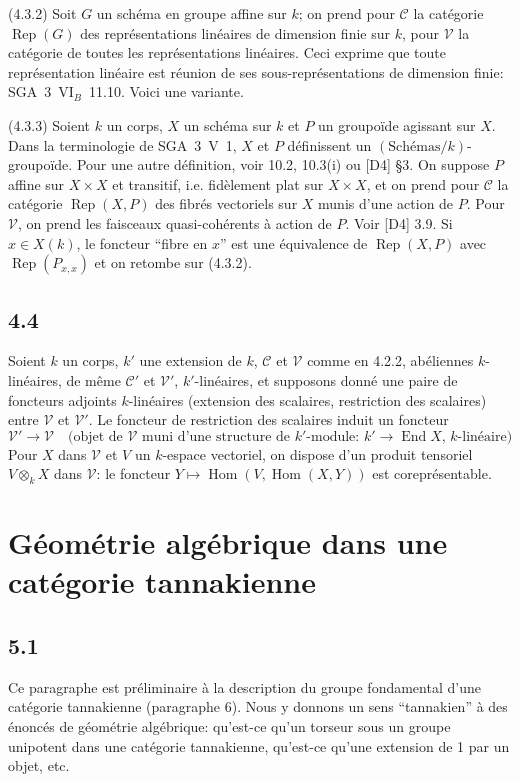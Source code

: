 \documentclass[12pt,a4paper]{article}
\theoremstyle{plain}
\theoremstyle{definition}
\theoremstyle{remark}
\DeclareMathOperator{\Hom}{Hom}
\DeclareMathOperator{\End}{End}
\DeclareMathOperator{\Rep}{Rep}
\begin{document}
(4.3.2) Soit $G$ un schéma en groupe affine sur $k$; on prend pour $\mathcal{C}$ la catégorie $\Rep(G)$ des représentations linéaires de dimension finie sur $k$, pour $\mathcal{V}$ la catégorie de toutes les représentations linéaires. Ceci exprime que toute représentation linéaire est réunion de ses sous-représentations de dimension finie: SGA~3~VI$_{B}$~11.10. Voici une variante.

(4.3.3) Soient $k$ un corps, $X$ un schéma sur $k$ et $P$ un groupoïde agissant sur $X$. Dans la terminologie de SGA~3~V~1, $X$ et $P$ définissent un $(\mathrm{Schémas}/k)$-groupoïde. Pour une autre définition, voir 10.2, 10.3(i) ou [D4] §3. On suppose $P$ affine sur $X 
\times X$ et transitif, i.e. fidèlement plat sur $X 
\times X$, et on prend pour $\mathcal{C}$ la catégorie $\Rep(X, P)$ des fibrés vectoriels sur $X$ munis d'une action de $P$. Pour $\mathcal{V}$, on prend les faisceaux quasi-cohérents à action de $P$. Voir [D4] 3.9. Si $x 
\in X(k)$, le foncteur ``fibre en $x$'' est une équivalence de $\Rep(X,P)$ avec $\Rep(P_{x,x})$ et on retombe sur (4.3.2).

\subsection*{4.4}

Soient $k$ un corps, $k'$ une extension de $k$, $\mathcal{C}$ et $\mathcal{V}$ comme en 4.2.2, abéliennes $k$-linéaires, de même $\mathcal{C}'$ et $\mathcal{V}'$, $k'$-linéaires, et supposons donné une paire de foncteurs adjoints $k$-linéaires (extension des scalaires, restriction des scalaires) entre $\mathcal{V}$ et $\mathcal{V}'$. Le foncteur de restriction des scalaires induit un foncteur
\begin{equation*}\tag{4.4.1}
\mathcal{V}' 
\longrightarrow 
\mathcal{V} 
\quad 
\text{(objet de $\mathcal{V}$ muni d'une structure de $k'$-module: $k' 
\to 
\End X$, $k$-linéaire)}
\end{equation*}
Pour $X$ dans $\mathcal{V}$ et $V$ un $k$-espace vectoriel, on dispose d'un produit tensoriel $V 
\otimes_k X$ dans $\mathcal{V}$: le foncteur $Y 
\mapsto 
\Hom(V, 
\Hom(X,Y))$ est coreprésentable.

\section{Géométrie algébrique dans une catégorie tannakienne}
\label{sec:5}

\subsection*{5.1}
Ce paragraphe est préliminaire à la description du groupe fondamental d'une catégorie tannakienne (paragraphe 6). Nous y donnons un sens ``tannakien'' à des énoncés de géométrie algébrique: qu'est-ce qu'un torseur sous un groupe unipotent dans une catégorie tannakienne, qu'est-ce qu'une extension de 1 par un objet, etc.
\end{document}
